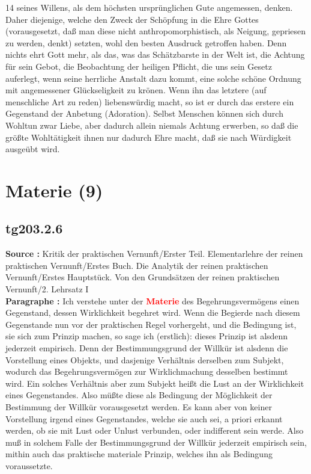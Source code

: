 \documentclass[a4paper,12pt,twoside]{book}
\newcommand{\match}[1]{\textcolor{red}{\textbf{#1}}}
\newcommand{\unnumberedsection}[1]{
	\section*{#1}
	\addcontentsline{toc}{section}{#1}
	\markright{#1}
}
\begin{document}
	
	
	14
	seines Willens, als dem höchsten ursprünglichen Gute angemessen, denken. Daher diejenige, welche den Zweck der Schöpfung in die Ehre Gottes (vorausgesetzt, daß man diese nicht anthropomorphistisch, als Neigung, gepriesen zu werden, denkt) setzten, wohl den besten Ausdruck getroffen haben. Denn nichts ehrt Gott mehr, als das, was das Schätzbarste in der Welt ist, die Achtung für sein Gebot, die Beobachtung der heiligen Pflicht, die uns sein Gesetz auferlegt, wenn seine herrliche Anstalt dazu kommt, eine solche schöne Ordnung mit angemessener Glückseligkeit zu krönen. Wenn ihn das letztere (auf menschliche Art zu reden) liebenswürdig macht, so ist er durch das erstere ein Gegenstand der Anbetung (Adoration). Selbst Menschen können sich durch Wohltun zwar Liebe, aber dadurch allein niemals Achtung erwerben, so daß die größte Wohltätigkeit ihnen nur dadurch Ehre macht, daß sie nach Würdigkeit ausgeübt wird. 
	
	\unnumberedsection{Materie (9)} 
	\subsection*{tg203.2.6} 
	\textbf{Source : }Kritik der praktischen Vernunft/Erster Teil. Elementarlehre der reinen praktischen Vernunft/Erstes Buch. Die Analytik der reinen praktischen Vernunft/Erstes Hauptstück. Von den Grundsätzen der reinen praktischen Vernunft/2. Lehrsatz I\\  
	
	\noindent\textbf{Paragraphe : }Ich verstehe unter der \match{Materie} des Begehrungsvermögens einen Gegenstand, dessen Wirklichkeit begehret wird. Wenn  die Begierde nach diesem Gegenstande nun vor der praktischen Regel vorhergeht, und die Bedingung ist, sie sich zum Prinzip machen, so sage ich (erstlich): dieses Prinzip ist alsdenn jederzeit empirisch. Denn der Bestimmungsgrund der Willkür ist alsdenn die Vorstellung eines Objekts, und dasjenige Verhältnis derselben zum Subjekt, wodurch das Begehrungsvermögen zur Wirklichmachung desselben bestimmt wird. Ein solches Verhältnis aber zum Subjekt heißt die Lust an der Wirklichkeit eines Gegenstandes. Also müßte diese als Bedingung der Möglichkeit der Bestimmung der Willkür vorausgesetzt werden. Es kann aber von keiner Vorstellung irgend eines Gegenstandes, welche sie auch sei, a priori erkannt werden, ob sie mit Lust oder Unlust verbunden, oder indifferent sein werde. Also muß in solchem Falle der Bestimmungsgrund der Willkür jederzeit empirisch sein, mithin auch das praktische materiale Prinzip, welches ihn als Bedingung voraussetzte. 
	
\end{document}
